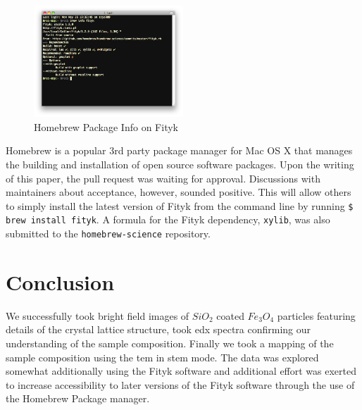 \documentclass[12pt,a4paper]{article}
\begin{document}
\begin{figure}
  \centering
  \includegraphics[width=0.5\textwidth]{Data/Screen shot 2014-05-26 at 7.33.21 PM.png}
  \caption{Homebrew Package Info on Fityk}
  \label{fig:homebrew}
\end{figure}

Homebrew\cite{home} is a popular 3rd party package manager for Mac OS X that manages the building and installation of open source software packages.  Upon the writing of this paper, the pull request was waiting for approval.  Discussions with maintainers about acceptance, however, sounded positive\cite{fpr}.  This will allow others to simply install the latest version of Fityk from the command line by running \texttt{\$ brew install fityk}.  A formula for the Fityk dependency, \texttt{xylib}, was also submitted to the \texttt{homebrew-science} repository\cite{xpr}. 


\section{Conclusion} %

We successfully took bright field images of $SiO_2$ coated $Fe_3O_4$ particles featuring details of the crystal lattice structure, took \ac{edx} spectra confirming our understanding of the sample composition.  Finally we took a mapping of the sample composition using the \ac{tem} in \ac{stem} mode.  The data was explored somewhat additionally using the Fityk software and additional effort was exerted to increase accessibility to later versions of the Fityk software through the use of the Homebrew Package manager.

 
 \nocite{*}
\end{document}
